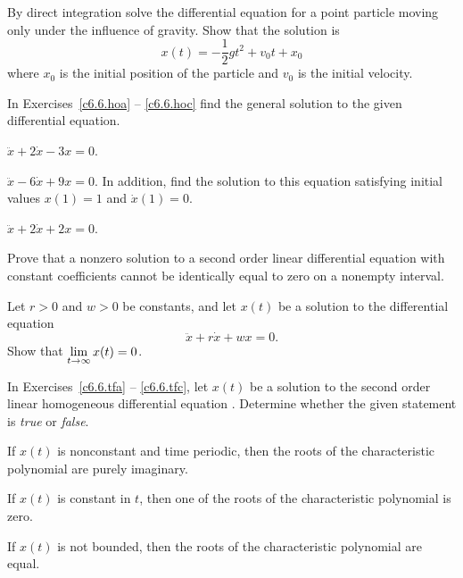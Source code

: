 \begin{exercise} \label{c6.7.2}
By direct integration solve the differential equation 
for a point particle moving only under the influence of gravity.  Show
that the solution is
\[
x(t) = -\frac{1}{2}gt^2 + v_0t + x_0
\]
where $x_0$ is the initial position of the particle and $v_0$ is the initial
velocity.
\end{exercise}

\noindent  In Exercises~\ref{c6.6.hoa} -- \ref{c6.6.hoc} find the general
solution to the given differential equation.
\begin{exercise} \label{c6.6.hoa}
$\ddot{x} + 2\dot{x} - 3x = 0$.
\end{exercise}
\begin{exercise} \label{c6.6.hob}
$\ddot{x} - 6\dot{x} + 9x = 0$.
In addition, find the solution to this equation satisfying
initial values $x(1)=1$ and $\dot{x}(1)=0$.
\end{exercise}
\begin{exercise} \label{c6.6.hoc}
$\ddot{x} + 2\dot{x} + 2x = 0$.
\end{exercise}

\begin{exercise} \label{c6.7.3}
Prove that a nonzero solution to a second order linear differential equation
with constant coefficients cannot be identically equal to zero on a nonempty
interval.
\end{exercise}

\begin{exercise} \label{c6.7.4}
Let $r>0$ and $w>0$ be constants, and let $x(t)$ be a solution to the
differential equation
\[
\ddot{x} + r\dot{x} + wx = 0.
\]
Show that $\displaystyle\lim_{t\to\infty} x(t) = 0$.
\end{exercise}

\noindent In Exercises~\ref{c6.6.tfa} -- \ref{c6.6.tfc}, let $x(t)$ be a
solution to the second order linear homogeneous differential equation
.  Determine whether the given statement is {\em true\/}
or {\em false}.
\begin{exercise} \label{c6.6.tfa}
If $x(t)$ is nonconstant and time periodic, then the
roots of the characteristic polynomial are purely imaginary.
\end{exercise}
\begin{exercise} \label{c6.6.tfb}
If $x(t)$ is constant in $t$, then one of the roots of
the characteristic polynomial is zero.
\end{exercise}
\begin{exercise} \label{c6.6.tfc}
If $x(t)$ is not bounded, then the roots of the characteristic
polynomial are equal.
\end{exercise}

